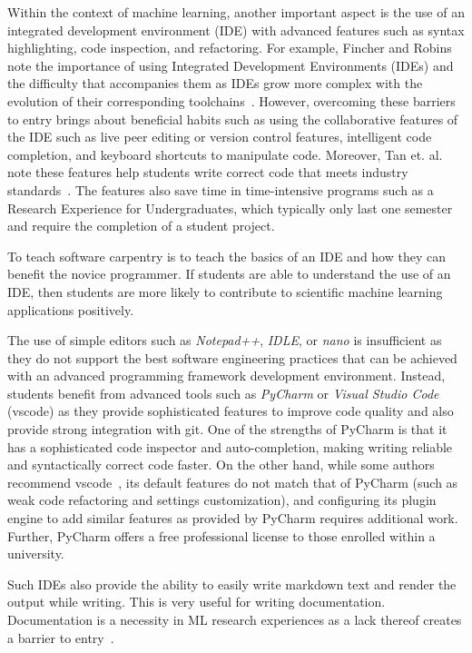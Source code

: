 \documentclass[utf8]{FrontiersinVancouver} %
\begin{document}
Within the context of machine learning, another important aspect is the use of an integrated development environment (IDE) with advanced features such as syntax highlighting, code inspection, and refactoring. For example, Fincher and Robins note the importance of using Integrated Development Environments (IDEs) and the difficulty that accompanies them as IDEs grow more complex with the evolution of their corresponding toolchains~\cite{fincher_robins_2019}. However, overcoming these barriers to entry brings about beneficial habits such as using the collaborative features of the IDE such as live peer editing or version control features, intelligent code completion, and keyboard shortcuts to manipulate code. Moreover, Tan et. al. note these features help students write correct code that meets industry standards~\cite{tan_chen}. The features also save time in time-intensive programs such as a Research Experience for Undergraduates, which typically only last one semester and require the completion of a student project.

To teach software carpentry is to teach the basics of an IDE and how they can benefit the novice programmer. If students are able to understand the use of an IDE, then students are more likely to contribute to scientific machine learning applications positively.

The use of simple editors such as {\em Notepad++}, {\em IDLE}, or {\em nano} is insufficient as they do not support the best software engineering practices that can be achieved with an advanced programming framework development environment. Instead, students benefit from advanced tools such as {\em PyCharm} or {\em Visual Studio Code} (vscode) as they provide sophisticated features to improve code quality and also provide strong integration with git. One of the strengths of PyCharm is that it has a sophisticated code inspector and auto-completion, making writing reliable and syntactically correct code faster. On the other hand, while some authors recommend vscode~\cite{tan_chen}, its default features do not match that of PyCharm (such as weak code refactoring and settings customization), and configuring its plugin engine to add similar features as provided by PyCharm requires additional work. Further, PyCharm offers a free professional license to those enrolled within a university.

Such IDEs also provide the ability to easily write markdown text and render the output while writing. This is very useful for writing documentation. Documentation is a necessity in ML research experiences as a lack thereof creates a barrier to entry~\cite{konigstorfer}.
\end{document}
